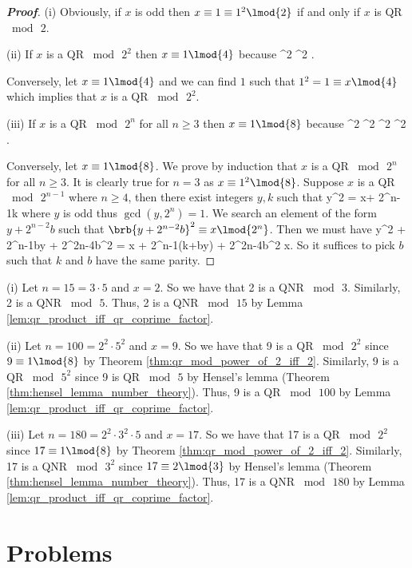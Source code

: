 \begin{proof}[\bf Proof]
\ben
\item [(i)] Obviously,  if $x$ is odd then $x\equiv 1\equiv 1^2 \lmod{2}$ if and only if $x$ is QR $\bmod\, 2$.
\item [(ii)] If $x$ is a QR $\bmod\, 2^2$ then $x\equiv 1\lmod{4}$ because
^2 ^2  .
\ee

Conversely, let $x\equiv 1\lmod{4}$ and we can find $1$ such that $1^2 = 1\equiv x\lmod{4}$ which implies that $x$ is a QR $\bmod\, 2^2$.

\item [(iii)] If $x$ is a QR $\bmod\, 2^n$ for all $n\geq 3$ then $x\equiv 1 \lmod{8}$ because
^2 ^2 ^2 ^2  .
\ee%

Conversely, let $x\equiv 1 \lmod{8}$. We prove by induction that $x$ is a QR $\bmod\, 2^n$ for all $n\geq 3$. It is clearly true for $n=3$ as $x\equiv 1^2\lmod{8}$. Suppose $x$ is a QR $\bmod\,2^{n-1}$ where $n\geq 4$, then there exist integers $y,k$ such that
\be
y^2 = x+ 2^{n-1}k
\ee
where $y$ is odd thus $\gcd(y,2^n)=1$. We search an element of the form $y + 2^{n-2}b$ such that $\brb{y + 2^{n-2}b}^2 \equiv x \lmod{2^n}$. Then we must have
\be
y^2 + 2^{n-1}by + 2^{2n-4}b^2 = x + 2^{n-1}(k+by) + 2^{2n-4}b^2 \equiv x.
\ee
So it suffices to pick $b$ such that $k$ and $b$ have the same parity. %
\een
\end{proof}

\begin{example}
\ben
\item [(i)] Let $n = 15= 3\cdot 5$ and $x = 2$. So we have that 2 is a QNR $\bmod\, 3$. Similarly, 2 is a QNR $\bmod\, 5$. Thus, 2 is a QNR $\bmod\, 15$ by Lemma \ref{lem:qr_product_iff_qr_coprime_factor}.

\item [(ii)] Let $n = 100 = 2^2\cdot 5^2$ and $x = 9$. So we have that 9 is a QR $\bmod\, 2^2$ since $9\equiv 1\lmod{8}$ by Theorem \ref{thm:qr_mod_power_of_2_iff_2}. Similarly, 9 is a QR $\bmod\, 5^2$ since 9 is QR $\bmod \, 5$ by Hensel's lemma (Theorem \ref{thm:hensel_lemma_number_theory}). Thus, 9 is a QR $\bmod\, 100$ by Lemma \ref{lem:qr_product_iff_qr_coprime_factor}.

\item [(iii)] Let $n = 180 = 2^2\cdot 3^2\cdot 5 $ and $x = 17$. So we have that 17 is a QR $\bmod\, 2^2$ since $17\equiv 1\lmod{8}$ by Theorem \ref{thm:qr_mod_power_of_2_iff_2}. Similarly, 17 is a QNR $\bmod\, 3^2$ since $17\equiv 2\lmod{3}$ by Hensel's lemma (Theorem \ref{thm:hensel_lemma_number_theory}). Thus, 17 is a QNR $\bmod\, 180$ by Lemma \ref{lem:qr_product_iff_qr_coprime_factor}.
\een
\end{example}


\section{Problems}

